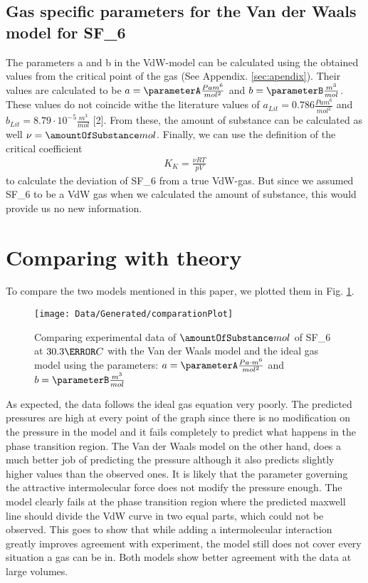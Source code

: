 \documentclass[a4paper,10pt,twocolumn]{article}
\begin{document}
    \subsection{Gas specific parameters for the Van der Waals model for SF_6\)}\label{subsec:gasSpecParams}
    The parameters a and b in the VdW-model can be calculated using the obtained values from the critical point of the gas (See Appendix. \ref{sec:apendix}).
    Their values are calculated to be $a = \parameterA \frac{Pa m^6}{mol^2}$ and $b =\parameterB \frac{m^3}{mol}$.
    These values do not coincide withe the literature values of $a_{Lit} = 0.786 \frac{Pa m^6}{mol^2}$ and $b_{Lit} = 8.79\cdot 10^{-5} \frac{m^3}{mol}$ [2].
    From these, the amount of substance can be calculated as well $\nu = \amountOfSubstance mol$.
    Finally, we can use the definition of the critical coefficient
    \begin{align}\label{eq:critcalCoeff}
        K_K = \frac{\nu RT}{pV}
    \end{align}
    to calculate the deviation of SF_6\) from a true VdW-gas.
    But since we assumed SF_6\) to be a VdW gas when we calculated the amount of substance, this would provide us no new information.
    
    \section{Comparing with theory}\label{sec:comaringTheory}
    To compare the two models mentioned in this paper, we plotted them in Fig.  \ref{fig:comparingTheories}.
    \begin{figure}
        \begin{center}
            \texttt{[image: Data/Generated/comparationPlot]}
            \caption[]{Comparing experimental data of $\amountOfSubstance mol$ of SF_6\) at $30.3\degree C$ with the Van der Waals model and the ideal gas model using the parameters:
            $a=\parameterA \frac{Pa\cdot m^6}{mol^2}$ and $b=\parameterB \frac{m^3}{mol}$}
            \label{fig:comparingTheories}
        \end{center}
    \end{figure}
    As expected, the data follows the ideal gas equation very poorly.
    The predicted pressures are high at every point of the graph since there is no modification on the pressure in the model and it fails completely to predict what happens in the phase transition region.
    The Van der Waals model on the other hand, does a much better job of predicting the pressure although it also predicts slightly higher values than the observed ones.
    It is likely that the parameter governing the attractive intermolecular force does not modify the pressure enough.
    The model clearly fails at the phase transition region where the predicted maxwell line should divide the VdW curve in two equal parts, which could not be observed.
    This goes to show that while adding a intermolecular interaction greatly improves agreement with experiment, the model still does not cover every situation a gas can be in.
    Both models show better agreement with the data at large volumes.
\end{document}

